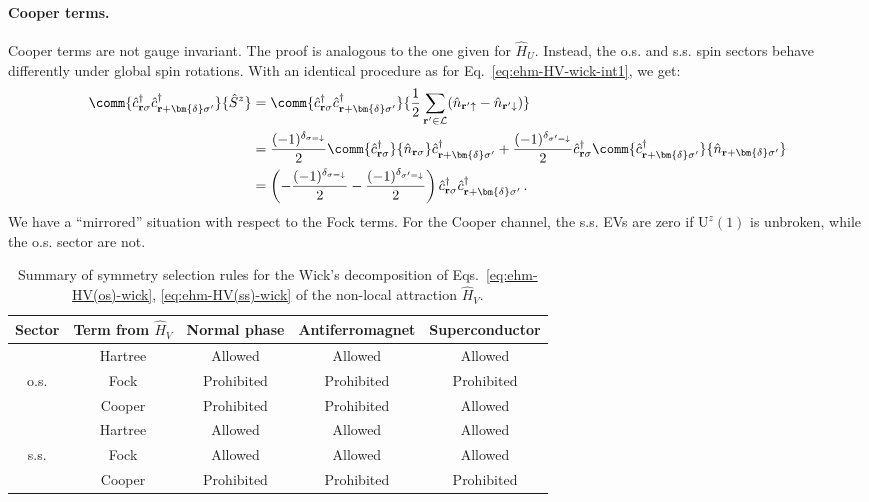 \paragraph{Cooper terms.} Cooper terms are not gauge invariant. The proof is analogous to the one given for $\hat H_U$. Instead, the o.s. and s.s. spin sectors behave differently under global spin rotations. With an identical procedure as for Eq.~\eqref{eq:ehm-HV-wick-int1}, we get:
\begin{align}
	\comm{\hat c_{\mathbf{r}\sigma}^\dagger \hat c_{\mathbf{r}+\bm{\delta}\sigma'}^\dagger}{\hat S^z} &= \comm{\hat c_{\mathbf{r}\sigma}^\dagger \hat c_{\mathbf{r}+\bm{\delta}\sigma'}^\dagger}{\frac{1}{2} \sum_{\mathbf{r}'\in\mathcal{L}} (\hat n_{\mathbf{r}'\uparrow}-\hat n_{\mathbf{r}'\downarrow}) } \nonumber \\
	&= \frac{(-1)^{\delta_{\sigma=\downarrow}}}{2} \comm{\hat c_{\mathbf{r}\sigma}^\dagger}{\hat n_{\mathbf{r}\sigma}} \hat c_{\mathbf{r}+\bm{\delta}\sigma'}^\dagger + \frac{(-1)^{\delta_{\sigma'=\downarrow}}}{2} \hat c_{\mathbf{r}\sigma}^\dagger \comm{\hat c_{\mathbf{r}+\bm{\delta}\sigma'}^\dagger}{\hat n_{\mathbf{r}+\bm{\delta}\sigma'}} \nonumber \\
	&= \left(
	-\frac{(-1)^{\delta_{\sigma=\downarrow}}}{2} - \frac{(-1)^{\delta_{\sigma'=\downarrow}}}{2}
	\right)\hat c_{\mathbf{r}\sigma}^\dagger \hat c_{\mathbf{r}+\bm{\delta}\sigma'}^\dagger \, . \label{eq:ehm-HV-wick-int2}
\end{align}
We have a ``mirrored'' situation with respect to the Fock terms. For the Cooper channel, the s.s. EVs are zero if $\mathrm{U}^z(1)$ is unbroken, while the o.s. sector are not.

\begin{table}
	\centering
	\begin{tabular}{c c c c c}
		\textbf{Sector}& \textbf{Term from $\hat H_V$} & \textbf{Normal phase} & \textbf{Antiferromagnet} & \textbf{Superconductor} \\
		\midrule
		& Hartree & Allowed & Allowed & Allowed \\
		o.s. & Fock & Prohibited & Prohibited & Prohibited \\
		& Cooper & Prohibited & Prohibited & Allowed \\
		\midrule
		& Hartree & Allowed & Allowed & Allowed \\
		s.s. & Fock & Allowed & Allowed & Allowed \\
		& Cooper & Prohibited & Prohibited & Prohibited \\
		\midrule
	\end{tabular}
	\caption{Summary of symmetry selection rules for the Wick's decomposition of Eqs.~\eqref{eq:ehm-HV(os)-wick}, \eqref{eq:ehm-HV(ss)-wick} of the non-local attraction $\hat H_V$.}
	\label{tab:HV-sel-rules}
\end{table}


